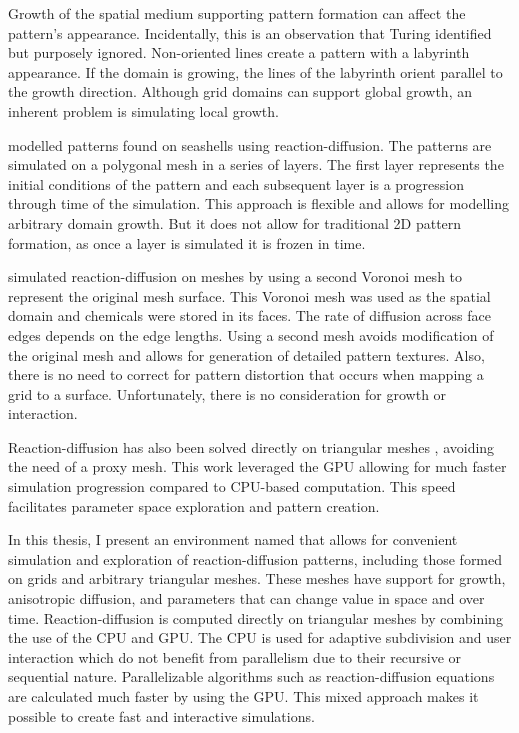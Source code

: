Growth of the spatial medium supporting pattern formation can affect the pattern's appearance. Incidentally, this is an observation that Turing identified but purposely ignored. Non-oriented lines create a pattern with a labyrinth appearance. If the domain is growing, the lines of the labyrinth orient parallel to the growth direction. Although grid domains can support global growth, an inherent problem is simulating local growth. 

\citet{fowler1992} modelled patterns found on seashells using reaction-diffusion. The patterns are simulated on a polygonal mesh in a series of layers. The first layer represents the initial conditions of the pattern and each subsequent layer is a progression through time of the simulation. This approach is flexible and allows for modelling arbitrary domain growth. But it does not allow for traditional 2D pattern formation, as once a layer is simulated it is frozen in time.

\citet{turk1991} simulated reaction-diffusion on meshes by using a second Voronoi mesh to represent the original mesh surface. This Voronoi mesh was used as the spatial domain and chemicals were stored in its faces. The rate of diffusion across face edges depends on the edge lengths. Using a second mesh avoids modification of the original mesh and allows for generation of detailed pattern textures. Also, there is no need to correct for pattern distortion that occurs when mapping a grid to a surface. Unfortunately, there is no consideration for growth or interaction. %

Reaction-diffusion has also been solved directly on triangular meshes \citep{descombes2016}, avoiding the need of a proxy mesh. This work leveraged the GPU allowing for much faster simulation progression compared to CPU-based computation. This speed facilitates parameter space exploration and pattern creation. 

In this thesis, I present an environment named \ProgramName{} that allows for convenient simulation and exploration of reaction-diffusion patterns, including those formed on grids and arbitrary triangular meshes. These meshes have support for growth, anisotropic diffusion, and parameters that can change value in space and over time. Reaction-diffusion is computed directly on triangular meshes by combining the use of the CPU and GPU. The CPU is used for adaptive subdivision and user interaction which do not benefit from parallelism due to their recursive or sequential nature. Parallelizable algorithms such as reaction-diffusion equations are calculated much faster by using the GPU. This mixed approach makes it possible to create fast and interactive simulations. 


